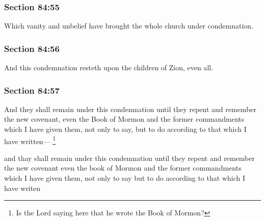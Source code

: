 	\subsubsection{Section 84:55} %
		\label{DC84-55}

		Which vanity and unbelief have brought the whole church under condemnation.


	\subsubsection{Section 84:56} %
		\label{DC84-56}

		And this condemnation resteth upon the children of Zion, even all.


	\subsubsection{Section 84:57} %
		\label{DC84-57}

		And they shall remain under this condemnation until they repent and remember the new covenant, even the Book of Mormon and the former commandments which I have given them, not only to say, but to do according to that which I have written---%
			\footnote{%
				Is the Lord saying here that he wrote the Book of Mormon?
				}

		\begin{framed}
		\scriptsize
			\begin{compactdesc}
				\item[JSP] and thay shall remain under this condemnation until they repent and remember the new covenant even the book of Mormon and the former commandments which I have given them, not only to say but to do according to that which I have writen
			\end{compactdesc}
		\end{framed}

